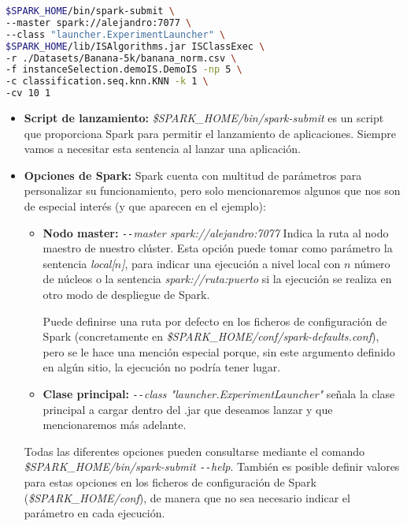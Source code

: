 \begin{lstlisting}[language=bash,label=lst:ejemploEjecucionComando,caption=Ejemplo de ejecución desde línea de comandos,captionpos=b,keywordstyle=\color{black}]
$SPARK_HOME/bin/spark-submit \
--master spark://alejandro:7077 \
--class "launcher.ExperimentLauncher" \
$SPARK_HOME/lib/ISAlgorithms.jar ISClassExec \
-r ./Datasets/Banana-5k/banana_norm.csv \
-f instanceSelection.demoIS.DemoIS -np 5 \
-c classification.seq.knn.KNN -k 1 \
-cv 10 1
\end{lstlisting}

\begin{itemize}
\item \textbf{Script de lanzamiento:} \textit{\$SPARK\_HOME/bin/spark-submit} es un script que proporciona Spark para permitir el lanzamiento de aplicaciones. Siempre vamos a necesitar esta sentencia al lanzar una aplicación.
\item \textbf{Opciones de Spark:} Spark cuenta con multitud de parámetros para personalizar su funcionamiento, pero solo mencionaremos algunos que nos son de especial interés (y que aparecen en el ejemplo):

\begin{itemize}

\item \textbf{Nodo master:} \textit{\texttt{-{}-}master spark://alejandro:7077} Indica la ruta al nodo maestro de nuestro clúster. Esta opción puede tomar como parámetro la sentencia \textit{local[$n$]}, para indicar una ejecución a nivel local con $n$ número de núcleos o la sentencia \textit{spark://ruta:puerto} si la ejecución se realiza en otro modo de despliegue de Spark.

Puede definirse una ruta por defecto en los ficheros de configuración de Spark (concretamente en \textit{\$SPARK\_HOME/conf/spark-defaults.conf}), pero se le hace una mención especial porque, sin este argumento definido en algún sitio, la ejecución no podría tener lugar.

\item \textbf{Clase principal:} \textit{\texttt{-{}-}class "launcher.ExperimentLauncher"} señala la clase principal a cargar dentro del .jar que deseamos lanzar y que mencionaremos más adelante.

\end{itemize}

Todas las diferentes opciones pueden consultarse mediante el comando \textit{\$SPARK\_HOME/bin/spark-submit \texttt{-{}-}help}. También es posible definir valores para estas opciones en los ficheros de configuración de Spark (\textit{\$SPARK\_HOME/conf}), de manera que no sea necesario indicar el parámetro en cada ejecución.



\end{itemize}
